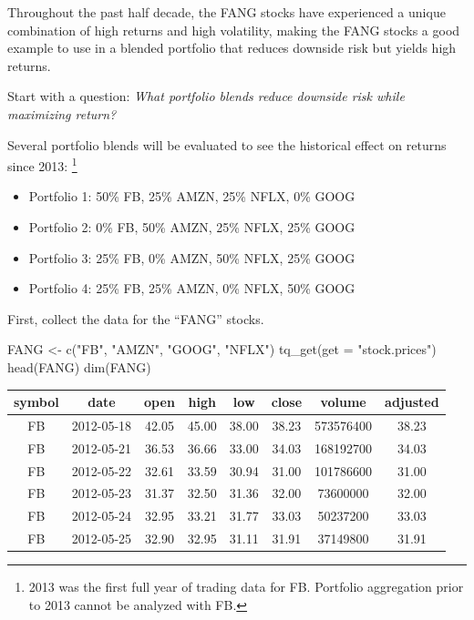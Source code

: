 Throughout the past half decade, the FANG stocks have experienced a
unique combination of high returns and high volatility, making the FANG
stocks a good example to use in a blended portfolio that reduces
downside risk but yields high returns.

\pagebreak

Start with a question: \emph{What portfolio blends reduce downside risk
while maximizing return?}

Several portfolio blends will be evaluated to see the historical effect
on returns since 2013:
\footnote{2013 was the first full year of trading data for FB. Portfolio aggregation prior to 2013 cannot be analyzed with FB.}

\begin{itemize}
\tightlist
\item
  Portfolio 1: 50\% FB, 25\% AMZN, 25\% NFLX, 0\% GOOG
\item
  Portfolio 2: 0\% FB, 50\% AMZN, 25\% NFLX, 25\% GOOG
\item
  Portfolio 3: 25\% FB, 0\% AMZN, 50\% NFLX, 25\% GOOG
\item
  Portfolio 4: 25\% FB, 25\% AMZN, 0\% NFLX, 50\% GOOG
\end{itemize}

First, collect the data for the ``FANG'' stocks.

\begin{Schunk}
\begin{Sinput}
FANG <- c("FB", "AMZN", "GOOG", "NFLX") %
    tq_get(get = "stock.prices")
head(FANG)
dim(FANG)
\end{Sinput}
\end{Schunk}

\begin{tabular}{cccccccc}
\toprule
symbol & date & open & high & low & close & volume & adjusted\\
\midrule
FB & 2012-05-18 & 42.05 & 45.00 & 38.00 & 38.23 & 573576400 & 38.23\\
FB & 2012-05-21 & 36.53 & 36.66 & 33.00 & 34.03 & 168192700 & 34.03\\
FB & 2012-05-22 & 32.61 & 33.59 & 30.94 & 31.00 & 101786600 & 31.00\\
FB & 2012-05-23 & 31.37 & 32.50 & 31.36 & 32.00 & 73600000 & 32.00\\
FB & 2012-05-24 & 32.95 & 33.21 & 31.77 & 33.03 & 50237200 & 33.03\\
FB & 2012-05-25 & 32.90 & 32.95 & 31.11 & 31.91 & 37149800 & 31.91\\
\bottomrule
\end{tabular}

